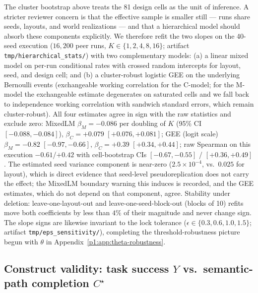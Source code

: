 \documentclass{article}
\begin{document}
The cluster bootstrap above treats the 81 design cells as the unit of
inference. A stricter reviewer concern is that the effective sample is
smaller still --- runs share seeds, layouts, and world realizations
--- and that a hierarchical model should absorb these components
explicitly. We therefore refit the two slopes on the 40-seed
execution ($16{,}200$ peer runs, $K \in \{1,2,4,8,16\}$; artifact
\texttt{tmp/hierarchical\_stats/}) with two complementary models:
(a) a linear mixed model on per-run conditional rates with crossed
random intercepts for layout, seed, and design cell; and (b) a
cluster-robust logistic GEE on the underlying Bernoulli events
(exchangeable working correlation for the C-model; for the M-model
the exchangeable estimate degenerates on saturated cells and we fall
back to independence working correlation with sandwich standard
errors, which remain cluster-robust). All four estimates agree in
sign with the raw statistics and exclude zero: MixedLM
$\beta_M = -0.086$ per doubling of $K$ (95\% CI $[-0.088, -0.084]$),
$\beta_C = +0.079$ $[+0.076, +0.081]$; GEE (logit scale)
$\beta_M = -0.82$ $[-0.97, -0.66]$, $\beta_C = +0.39$
$[+0.34, +0.44]$; raw Spearman on this execution
$-0.61$/$+0.42$ with cell-bootstrap CIs $[-0.67,-0.55]$ /
$[+0.36,+0.49]$. The estimated seed variance component is
near-zero ($2.5\times10^{-4}$, vs.\ $0.025$ for layout), which is
direct evidence that seed-level pseudoreplication does not carry the
effect; the MixedLM boundary warning this induces is recorded, and
the GEE estimates, which do not depend on that component, agree.
Stability under deletion: leave-one-layout-out and
leave-one-seed-block-out (blocks of 10) refits move both coefficients
by less than $4\%$ of their magnitude and never change sign. The
slope signs are likewise invariant to the lock tolerance
($\epsilon \in \{0.3, 0.6, 1.0, 1.5\}$; artifact
\texttt{tmp/eps\_sensitivity/}), completing the threshold-robustness
picture begun with $\theta$ in Appendix~\ref{p1:app:theta-robustness}.

\subsection{Construct validity: task success $Y$ vs.\ semantic-path completion $C^\star$}
\label{p1:app:y-vs-c}
\end{document}
